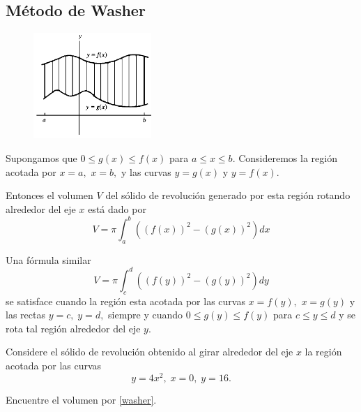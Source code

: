 \subsection{M\'etodo de Washer}


\begin{figure}
 \centering
 \includegraphics[height=4cm]{./calculo/fig3006.png}
 \label{fig:3006}
\end{figure}

Supongamos que $0\leq g(x) \leq f(x)$ para $a\leq x \leq b.$ Consideremos la regi\'on acotada por $x=a,$ $x=b,$ y las curvas $y=g(x)$ y $y=f(x).$ 

Entonces el volumen $V$ del s\'olido de revoluci\'on generado por esta regi\'on rotando alrededor del eje $x$ está dado por 
\begin{equation}
 \label{washer}
 \tag{Washer}
 V=\pi\int_{a}^{b}\left( (f(x))^{2}-(g(x))^{2} \right)dx
\end{equation}




Una f\'ormula similar
\begin{equation}
 \label{washer:2}
 \tag{Washer (II)}
 V=\pi\int_{c}^{d}\left( (f(y))^{2}-(g(y))^{2} \right)dy
\end{equation}
se satisface cuando la regi\'on esta acotada por las curvas $x=f(y),$ $x=g(y)$ y las rectas $y=c,\; y=d,$ siempre y cuando $0\leq g(y) \leq f(y)$ para $c\leq y \leq d$ y se rota tal regi\'on alrededor del eje $y.$



\begin{problema}
 \label{exmp:30.3}
 Considere el s\'olido de revoluci\'on obtenido al girar  alrededor del eje $x$ la regi\'on acotada por las curvas $$y=4x^{2}, \; x=0, \;y=16.$$ 

Encuentre el volumen por \eqref{washer}.
\end{problema}




